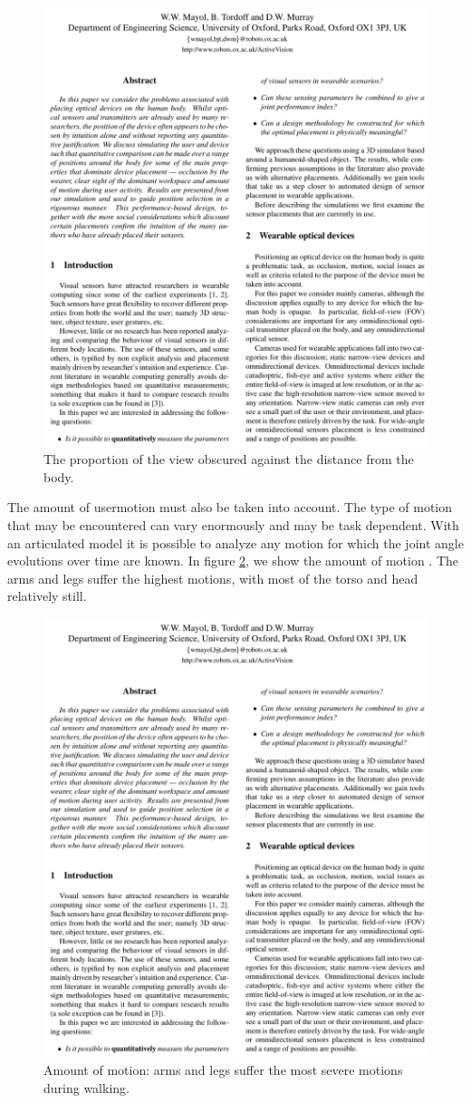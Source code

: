 \begin{figure}[htbp]
	\centering
		\includegraphics[page=4]{Figures/mayol_etal_ouel224101_cropped.pdf}
	\caption{The proportion of the view obscured against the distance from the body.}
	\label{fig:Position2}
\end{figure}

The amount of usermotion must also be taken into account. The type of motion that may be encountered can vary enormously and
may be task dependent. With an articulated model it is possible to analyze any motion for which the joint angle evolutions over time are known. In figure \ref{fig:Position3}, we show the amount of motion . The arms and legs suffer the highest
motions, with most of the torso and head relatively still.

\begin{figure}[htbp]
	\centering
		\includegraphics[page=8,width=0.4\linewidth]{Figures/mayol_etal_ouel224101_cropped.pdf}
	\caption{Amount of motion: arms and legs suffer the most severe motions during walking.}
	\label{fig:Position3}
\end{figure}

